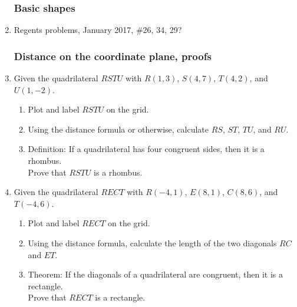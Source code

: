 \documentclass[12pt, oneside]{article}
\begin{document}
  \begin{enumerate}
    \subsubsection*{Basic shapes}
    \item Regents problems, January 2017, \#26, 34, 29?

\subsubsection*{Distance on the coordinate plane, proofs}
  \item Given the quadrilateral $RSTU$ with $R(1,3)$, $S(4,7)$, $T(4,2)$, and $U(1,-2)$.
    \begin{enumerate}
      \item Plot and label $RSTU$ on the grid.
      \item Using the distance formula or otherwise, calculate $RS$, $ST$, $TU$, and $RU$.
      \item Definition: If a quadrilateral has four congruent sides, then it is a rhombus.\\[0.5cm]
      Prove that $RSTU$ is a rhombus.
    \end{enumerate}
    \begin{center} %
    \end{center}

  \item Given the quadrilateral $RECT$ with $R(-4,1)$, $E(8,1)$, $C(8,6)$, and $T(-4,6)$.
    \begin{enumerate}
      \item Plot and label $RECT$ on the grid.
      \item Using the distance formula, calculate the length of the two diagonals $RC$ and $ET$.
      \item Theorem: If the diagonals of a quadrilateral are congruent, then it is a rectangle.\\[0.5cm]
      Prove that $RECT$ is a rectangle.
    \end{enumerate}
    \begin{center} %
    \end{center}

  \end{enumerate}
\end{document}

